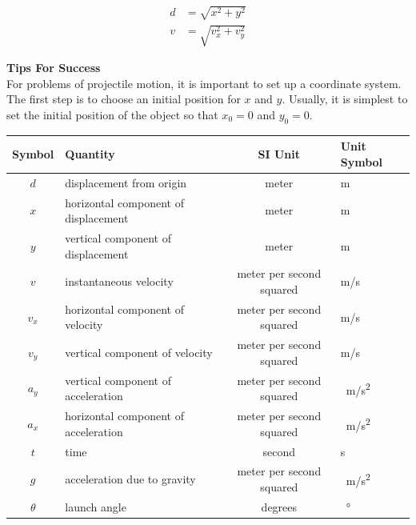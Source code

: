 \documentclass[main-physics.tex]{subfiles}
\begin{document}
\begin{align}
    d &= \sqrt{x^2 + y^2} \label{XvIie8} \\[0.5ex]
    v &= \sqrt{v_x^2 + v_y^2} \label{glASeI}
\end{align}

\begin{mdframed}[backgroundcolor=cpBlue]
{\color{white}
    \textbf{Tips For Success}\\
    For problems of projectile motion, it is important to set up a coordinate system. The first step is to choose an initial position for $x$ and $y$. Usually, it is simplest to set the initial position of the object so that $x_0 = 0$ and $y_0 = 0$.
}
\end{mdframed}

\vspace{1em}

\begin{center}
    \begin{tabular}{cl|cl}
    \hline
    \textbf{Symbol} & \textbf{Quantity} & \textbf{SI Unit} & \textbf{Unit Symbol}  \\
    \hline\hline
        $d$ & displacement from origin & meter & m\\
        $x$ & horizontal component of displacement & meter & m\\
        $y$ & vertical component of displacement & meter & m\\
        $v$ & instantaneous velocity & meter per second squared & m/s\\
        $v_x$ & horizontal component of velocity & meter per second squared & m/s\\
        $v_y$ & vertical component of velocity & meter per second squared & m/s\\
        $a_y$ & vertical component of acceleration & meter per second squared & \SI{}{m/s^2}\\ 
        $a_x$ & horizontal component of acceleration & meter per second squared & \SI{}{m/s^2}\\
        $t$ & time & second & s\\
        $g$ & acceleration due to gravity & meter per second squared & \SI{}{m/s^2}\\
        $\theta$ & launch angle & degrees & \SI{}{\degree}\\
    \hline
    \end{tabular}
\captionsetup{type=table,margin=1in,font=scriptsize}
\label{zvgNdH}
\end{center}
\end{document}
